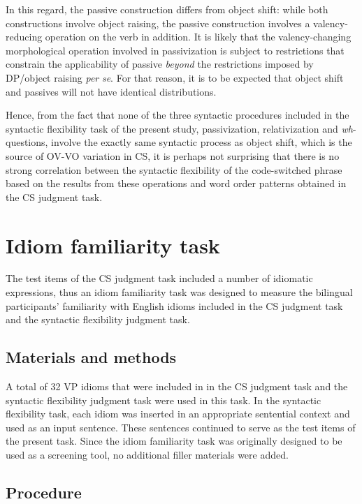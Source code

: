 In this regard, the passive construction differs from object shift: while both constructions involve object raising, the passive construction involves a valency-reducing operation on the verb in addition. It is likely that the valency-changing morphological operation involved in passivization is subject to restrictions that constrain the applicability of passive \textit{beyond} the restrictions imposed by DP/object raising \textit{per} \textit{se}. For that reason, it is to be expected that object shift and passives will not have identical distributions.

Hence, from the fact that none of the three syntactic procedures included in the syntactic flexibility task of the present study, passivization, relativization and \textit{wh}{}-questions, involve the exactly same syntactic process as object shift, which is the source of \ac{OV}-\ac{VO} variation in \ac{CS}, it is perhaps not surprising that there is no strong correlation between the syntactic flexibility of the code-switched phrase based on the results from these operations and word order patterns obtained in the \ac{CS} judgment task.  

\section{Idiom familiarity task}\label{ch2:sect:2.3}

The test items of the \ac{CS} judgment task included a number of idiomatic expressions, thus an idiom familiarity task was designed to measure the bilingual participants’ familiarity with English idioms included in the \ac{CS} judgment task and the syntactic flexibility judgment task. 

\subsection{Materials and methods}\label{ch2:sect:2.3.1} 

A total of 32 \ac{VP} idioms that were included in in the \ac{CS} judgment task and the syntactic flexibility judgment task were used in this task. In the syntactic flexibility task, each idiom was inserted in an appropriate sentential context and used as an input sentence. These sentences continued to serve as the test items of the present task. Since the idiom familiarity task was originally designed to be used as a screening tool, no additional filler materials were added. 

\subsection{Procedure}\label{ch2:sect:2.3.2}

